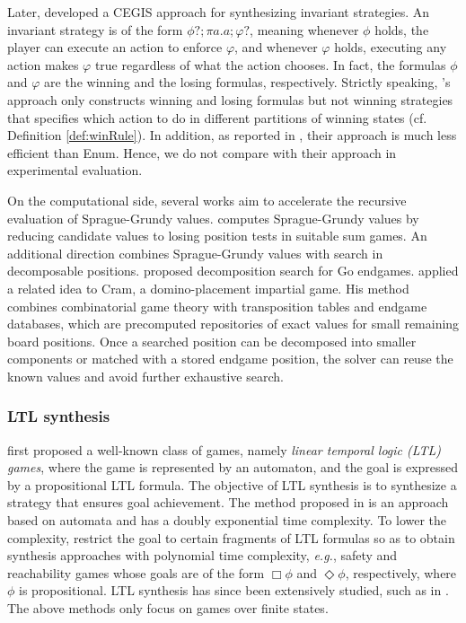 \documentclass[review]{elsarticle}
\newcommand\eg{{\it e.g.}}
\begin{document}
Later, \citet{LuoL2022} developed a CEGIS approach for synthesizing invariant strategies. 
An invariant strategy is of the form $\phi?; \pi a. a; \varphi?$, meaning whenever $\phi$ holds, the player can execute an action to enforce $\varphi$, and whenever $\varphi$ holds, executing any action makes $\varphi$ true regardless of what the action chooses.
In fact, the formulas $\phi$ and $\varphi$ are the winning and the losing formulas, respectively.
Strictly speaking, \citet{LuoL2022}'s approach only constructs winning and losing formulas but not winning strategies that specifies which action to do in different partitions of winning states (cf. Definition \ref{def:winRule}).
In addition, as reported in \cite{LuoL2022}, their approach is much less efficient than Enum.
Hence, we do not compare with their approach in experimental evaluation.

On the computational side, several works aim to accelerate the recursive evaluation of Sprague-Grundy values. 
\citet{lemoine2012} computes Sprague-Grundy values by reducing candidate values to losing position tests in suitable sum games. 
An additional direction combines Sprague-Grundy values with search in decomposable positions. 
\citet{muller1999} proposed decomposition search for Go endgames. 
\citet{uiterwijk2019} applied a related idea to Cram, a domino-placement impartial game. 
His method combines combinatorial game theory with transposition tables and endgame databases, which are precomputed repositories of exact values for small remaining board positions. 
Once a searched position can be decomposed into smaller components or matched with a stored endgame position, the solver can reuse the known values and avoid further exhaustive search.


\subsubsection{LTL synthesis}
\citet{PnuR1989} first proposed a well-known class of games, namely \textit{linear temporal logic (LTL) games}, where the game is represented by an automaton, and the goal is expressed by a propositional LTL formula.
The objective of LTL synthesis is to synthesize a strategy that ensures goal achievement.
The method proposed in \cite{PnuR1989} is an approach based on automata and has a doubly exponential time complexity.
To lower the complexity, \citet{AsaMPS1998} restrict the goal to certain fragments of LTL formulas so as to obtain synthesis approaches with polynomial time complexity, \eg, safety and reachability games whose goals are of the form $\Box \phi$ and $\Diamond \phi$, respectively, where $\phi$ is propositional.
LTL synthesis has since been extensively studied, such as in \cite{NikAN2015,ZhuTLPV2017,CamMBM2018,GiaFLVX2022,BalFR2023,KreMPR2023}.
The above methods only focus on games over finite states. 
\end{document}
